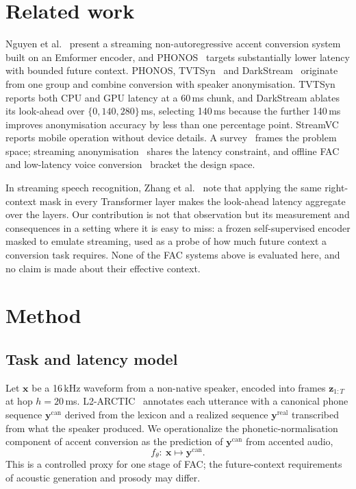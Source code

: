 \documentclass[journal]{IEEEtran}
\begin{document}
\section{Related work}

Nguyen et al.~\cite{nguyen2025streaming} present a streaming
non-autoregressive accent conversion system built on an Emformer encoder, and
PHONOS~\cite{phonos2026} targets substantially lower latency with bounded
future context. PHONOS, TVTSyn~\cite{tvtsyn2026} and
DarkStream~\cite{darkstream2025} originate from one group and combine
conversion with speaker anonymisation. TVTSyn reports both CPU and GPU latency
at a 60\,ms chunk, and DarkStream ablates its look-ahead over
$\{0, 140, 280\}$\,ms, selecting 140\,ms because the further 140\,ms improves
anonymisation accuracy by less than one percentage point.
StreamVC~\cite{streamvc2024} reports mobile operation without device details.
A survey~\cite{acsurvey2026} frames the problem space; streaming
anonymisation~\cite{streamvoiceanon2026, streamvoiceanonplus2026, e2eanon2024}
shares the latency constraint, and offline FAC~\cite{zhao2021fac,
accentron2022} and low-latency voice conversion~\cite{llvc2023} bracket the
design space.

In streaming speech recognition, Zhang et
al.~\cite{zhang2020transformertransducer} note that applying the same
right-context mask in every Transformer layer makes the look-ahead latency
aggregate over the layers. Our contribution is not that observation but its
measurement and consequences in a setting where it is easy to miss: a frozen
self-supervised encoder masked to emulate streaming, used as a probe of how
much future context a conversion task requires. None of the FAC systems above
is evaluated here, and no claim is made about their effective context.

\section{Method}
\label{sec:method}

\subsection{Task and latency model}
\label{sec:formulation}

Let $\mathbf{x}$ be a 16\,kHz waveform from a non-native speaker, encoded into
frames $\mathbf{z}_{1:T}$ at hop $h=20$\,ms. L2-ARCTIC~\cite{l2arctic2018}
annotates each utterance with a canonical phone sequence
$\mathbf{y}^{\mathrm{can}}$ derived from the lexicon and a realized sequence
$\mathbf{y}^{\mathrm{real}}$ transcribed from what the speaker produced. We
operationalize the phonetic-normalisation component of accent conversion as
the prediction of $\mathbf{y}^{\mathrm{can}}$ from accented audio,
\begin{equation}
f_\theta:\ \mathbf{x} \longmapsto \mathbf{y}^{\mathrm{can}}.
\label{eq:task}
\end{equation}
This is a controlled proxy for one stage of FAC; the future-context
requirements of acoustic generation and prosody may differ.
\end{document}
